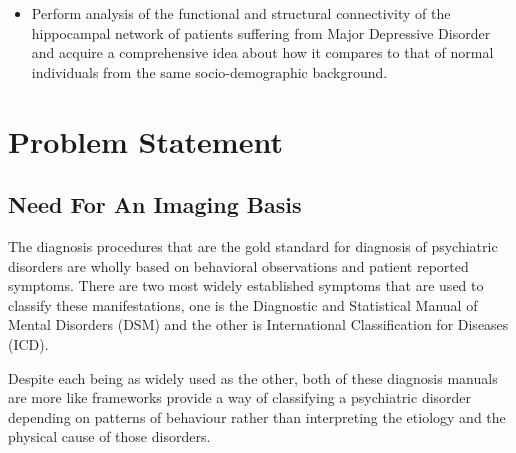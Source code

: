 \documentclass{article}
\begin{document}
\begin{itemize}

  \item Perform analysis of the functional and structural connectivity
    of the hippocampal network of patients suffering from Major
    Depressive Disorder and acquire a comprehensive idea about how it
    compares to that of normal individuals from the same
    socio-demographic background.



\end{itemize}



\newpage

\section{Problem Statement}

\subsection{Need For An Imaging Basis}

The diagnosis procedures that are the gold standard for diagnosis of
psychiatric disorders are wholly based on behavioral observations and
patient reported symptoms. There are two most widely established
symptoms that are used to classify these manifestations, one is the
Diagnostic and Statistical Manual of Mental Disorders (DSM) and the
other is International Classification for Diseases (ICD).

Despite each being as widely used as the other, both of these
diagnosis manuals are more like frameworks provide a way of
classifying a psychiatric disorder depending on patterns of behaviour
rather than interpreting the etiology and the physical cause of those
disorders.
\end{document}
